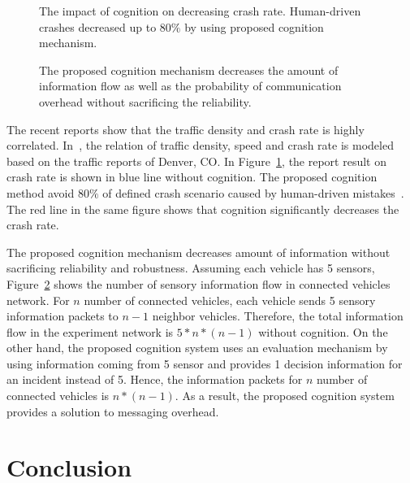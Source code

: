 \documentclass[journal, 11pt]{IEEEtran}
\begin{document}
\begin{figure}[!t]
\centerline{}
\vspace{-5pt}
\caption{The impact of cognition on decreasing crash rate. Human-driven crashes
decreased up to $80\%$ by using proposed cognition mechanism.}\label{fig:errorPlot}
\end{figure}

\begin{figure}[!t]
\centerline{}
\vspace{-5pt}
\caption{The proposed cognition mechanism decreases the amount of information
flow as well as the probability of communication overhead without sacrificing
the reliability.}\label{fig:infoFlow}
\end{figure}

{\color{red} The recent reports show that the traffic density and crash rate is
highly correlated. In~\cite{trb12}, the relation of traffic density, speed and
crash rate is modeled based on the traffic reports of Denver,  CO. In
Figure~\ref{fig:errorPlot}, the report result on crash rate is shown in blue
line without cognition. The proposed cognition method avoid $80\%$ of defined
crash scenario caused by human-driven mistakes~\cite[pg. 16]{hardingNHTSA14}.
The red line in the same figure shows that cognition significantly decreases the
crash rate. }

{\color{red} The proposed cognition mechanism decreases amount of information
without sacrificing reliability and robustness. Assuming each vehicle has 5
sensors, Figure~\ref{fig:infoFlow} shows the number of sensory information flow
in connected vehicles network. For $n$ number of connected vehicles, each
vehicle sends 5 sensory information packets to $n - 1$ neighbor vehicles.
Therefore, the total information flow in the experiment network is $5*n*(n-1)$
without cognition. On the other hand, the proposed cognition system uses an
evaluation mechanism by using information coming from 5 sensor and provides 1
decision information for an incident instead of 5. Hence, the information
packets for $n$ number of connected vehicles is $n*(n-1)$. As a result, the
proposed cognition system provides a solution to messaging overhead.}

\section{Conclusion}
\label{Conc}
%



% 
\end{document}

